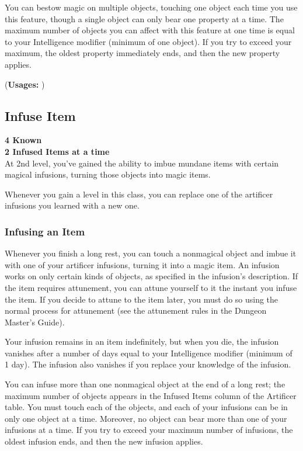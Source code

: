 {You can bestow magic on multiple objects, touching one object each time you use this feature, though a single object can only bear one property at a time. The maximum number of objects you can affect with this feature at one time is equal to your Intelligence modifier (minimum of one object). If you try to exceed your maximum, the oldest property immediately ends, and then the new property applies.

(\textbf{Usages: })
\subsection*{Infuse Item}
\textbf{4 Known}\\
\textbf{2 Infused Items at a time}\\
At 2nd level, you've gained the ability to imbue mundane items with certain magical infusions, turning those objects into magic items.

Whenever you gain a level in this class, you can replace one of the artificer infusions you learned with a new one.
\subsubsection*{Infusing an Item}
Whenever you finish a long rest, you can touch a nonmagical object and imbue it with one of your artificer infusions, turning it into a magic item. An infusion works on only certain kinds of objects, as specified in the infusion's description. If the item requires attunement, you can attune yourself to it the instant you infuse the item. If you decide to attune to the item later, you must do so using the normal process for attunement (see the attunement rules in the Dungeon Master's Guide).

Your infusion remains in an item indefinitely, but when you die, the infusion vanishes after a number of days equal to your Intelligence modifier (minimum of 1 day). The infusion also vanishes if you replace your knowledge of the infusion.

You can infuse more than one nonmagical object at the end of a long rest; the maximum number of objects appears in the Infused Items column of the Artificer table. You must touch each of the objects, and each of your infusions can be in only one object at a time. Moreover, no object can bear more than one of your infusions at a time. If you try to exceed your maximum number of infusions, the oldest infusion ends, and then the new infusion applies.

}
